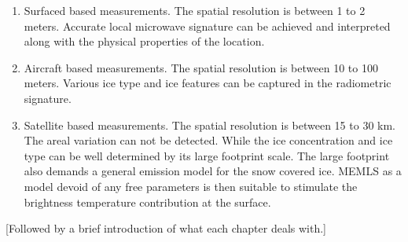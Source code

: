 \begin{enumerate}
\item Surfaced based measurements. The spatial resolution is between 1 to 2 meters. Accurate local microwave signature can be achieved and interpreted along with the physical properties of the location.
\item Aircraft based measurements. The spatial resolution is between 10 to 100 meters.  Various ice type and ice features can be captured in the radiometric signature. 
\item Satellite based measurements. The spatial resolution is between 15 to 30 km. The areal variation can not be detected. While the ice concentration and ice type can be well determined by its large footprint scale. The large footprint also demands a general emission model for the snow covered ice. MEMLS as a model devoid of any free parameters is then suitable to stimulate the brightness temperature contribution at the surface. 
\end{enumerate}
[Followed by a brief introduction of what each chapter deals with.]


